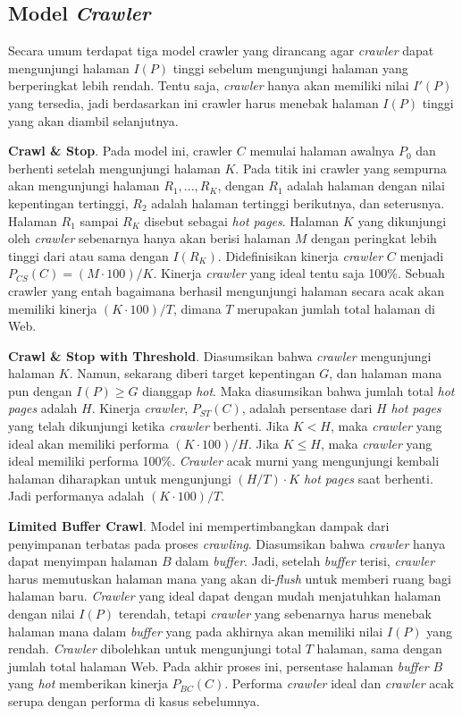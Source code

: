 \subsection{Model \emph{Crawler}}

Secara umum terdapat tiga model crawler yang dirancang agar \emph{crawler} dapat mengunjungi halaman $I(P)$ tinggi sebelum mengunjungi halaman yang berperingkat lebih rendah. Tentu saja, \emph{crawler} hanya akan memiliki nilai $I'(P)$ yang tersedia, jadi berdasarkan ini crawler harus menebak halaman $I(P)$ tinggi yang akan diambil selanjutnya.

\textbf{Crawl \& Stop}. Pada model ini, crawler $C$ memulai halaman awalnya $P_{0}$ dan berhenti setelah mengunjungi halaman $K$. Pada titik ini crawler yang sempurna akan mengunjungi halaman $R_{1}, ..., R_{K}$, dengan $R_{1}$ adalah halaman dengan nilai kepentingan tertinggi, $R_{2}$ adalah halaman tertinggi berikutnya, dan seterusnya. Halaman $R_{1}$ sampai $R_{K}$ disebut sebagai \emph{hot pages}. Halaman $K$ yang dikunjungi oleh \emph{crawler} sebenarnya hanya akan berisi halaman $M$ dengan peringkat lebih tinggi dari atau sama dengan $I(R_{K})$. Didefinisikan kinerja \emph{crawler} $C$ menjadi $P_{CS}(C) = (M \cdot 100) / K$. Kinerja \emph{crawler} yang ideal tentu saja 100\%. Sebuah crawler yang entah bagaimana berhasil mengunjungi halaman secara acak akan memiliki kinerja $(K \cdot 100) / T$, dimana $T$ merupakan jumlah total halaman di Web.

\textbf{Crawl \& Stop with Threshold}. Diasumsikan bahwa \emph{crawler} mengunjungi halaman $K$. Namun, sekarang diberi target kepentingan $G$, dan halaman mana pun dengan $I(P) \ge G$ dianggap \emph{hot}. Maka diasumsikan bahwa jumlah total \emph{hot pages} adalah $H$. Kinerja \emph{crawler}, $P_{ST}(C)$, adalah persentase dari $H$ \emph{hot pages} yang telah dikunjungi ketika \emph{crawler} berhenti. Jika $K < H$, maka \emph{crawler} yang ideal akan memiliki performa $(K \cdot 100) / H$. Jika $K \le H$, maka \emph{crawler} yang ideal memiliki performa 100\%. \emph{Crawler} acak murni yang mengunjungi kembali halaman diharapkan untuk mengunjungi $(H / T) \cdot K$ \emph{hot pages} saat berhenti. Jadi performanya adalah $(K \cdot 100) / T$.

\textbf{Limited Buffer Crawl}. Model ini mempertimbangkan dampak dari penyimpanan terbatas pada proses \emph{crawling}. Diasumsikan bahwa \emph{crawler} hanya dapat menyimpan halaman $B$ dalam \emph{buffer}. Jadi, setelah \emph{buffer} terisi, \emph{crawler} harus memutuskan halaman mana yang akan di-\emph{flush} untuk memberi ruang bagi halaman baru. \emph{Crawler} yang ideal dapat dengan mudah menjatuhkan halaman dengan nilai $I(P)$ terendah, tetapi \emph{crawler} yang sebenarnya harus menebak halaman mana dalam \emph{buffer} yang pada akhirnya akan memiliki nilai $I(P)$ yang rendah. \emph{Crawler} dibolehkan untuk mengunjungi total $T$ halaman, sama dengan jumlah total halaman Web. Pada akhir proses ini, persentase halaman \emph{buffer} $B$ yang \emph{hot} memberikan kinerja $P_{BC}(C)$. Performa \emph{crawler} ideal dan \emph{crawler} acak serupa dengan performa di kasus sebelumnya.

